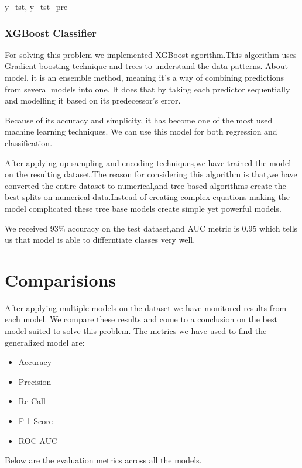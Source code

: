 y_tst, y_tst_pre\documentclass[12pt]{article}
\begin{document}
\subsubsection{XGBoost Classifier}
For solving this problem we implemented XGBoost agorithm.This algorithm uses Gradient boosting technique and trees to understand the data patterns. About model, it is an  ensemble method, meaning it’s a way of combining predictions from several models into one. It does that by taking each predictor sequentially and modelling it based on its predecessor’s error.

Because of its accuracy and simplicity, it has become one of the most used machine learning techniques. We can use this model for both regression and classification.

After applying up-sampling and encoding techniques,we have trained the model on the resulting dataset.The reason for considering this algorithm is that,we have converted the entire dataset to numerical,and tree based algorithms create the best splits on numerical data.Instead of creating complex equations making the model complicated these tree base models create simple yet powerful models.

We received 93\% accuracy on the test dataset,and AUC metric is 0.95 which tells us that model is able to differntiate classes very well. 

\section{Comparisions}

After applying multiple models on the dataset we have monitored results from each model. We compare these results and come to a conclusion on the best model suited to solve this problem.
The metrics we have used to find the generalized model are:

\begin{itemize}
  \item Accuracy
  \item Precision
  \item Re-Call
  \item F-1 Score
  \item ROC-AUC 
 \end{itemize}
 
Below are the evaluation metrics across all the models.
\end{document}
